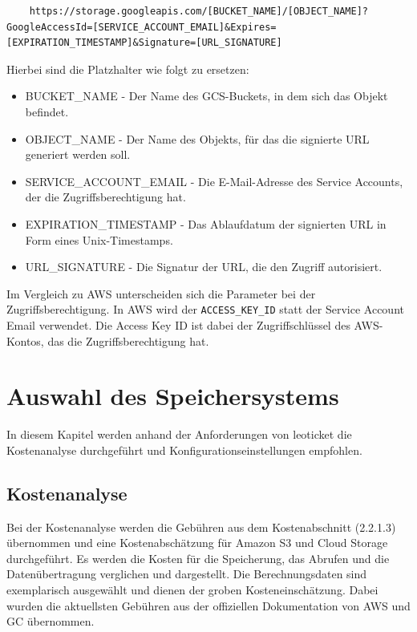 \begin{lstlisting}
	https://storage.googleapis.com/[BUCKET_NAME]/[OBJECT_NAME]?GoogleAccessId=[SERVICE_ACCOUNT_EMAIL]&Expires=[EXPIRATION_TIMESTAMP]&Signature=[URL_SIGNATURE]
\end{lstlisting}

Hierbei sind die Platzhalter wie folgt zu ersetzen:

\begin{itemize}
	\item BUCKET\_NAME - Der Name des GCS-Buckets, in dem sich das Objekt befindet.
	\item OBJECT\_NAME - Der Name des Objekts, für das die signierte URL generiert werden soll.
	\item SERVICE\_ACCOUNT\_EMAIL - Die E-Mail-Adresse des Service Accounts, der die Zugriffsberechtigung hat.
	\item EXPIRATION\_TIMESTAMP - Das Ablaufdatum der signierten URL in Form eines Unix-Timestamps.
	\item URL\_SIGNATURE - Die Signatur der URL, die den Zugriff autorisiert.
\end{itemize}

Im Vergleich zu AWS unterscheiden sich die Parameter bei der Zugriffsberechtigung. In AWS wird der \verb|ACCESS_KEY_ID| statt der Service Account Email verwendet. Die Access Key ID ist dabei der Zugriffschlüssel des AWS-Kontos, das die Zugriffsberechtigung hat.

\newpage

\section{Auswahl des Speichersystems}

In diesem Kapitel werden anhand der Anforderungen von leoticket die Kostenanalyse durchgeführt und Konfigurationseinstellungen empfohlen.

\subsection{Kostenanalyse}

Bei der Kostenanalyse werden die Gebühren aus dem Kostenabschnitt (2.2.1.3) übernommen und eine Kostenabschätzung für Amazon S3 und Cloud Storage durchgeführt. Es werden die Kosten für die Speicherung, das Abrufen und die Datenübertragung verglichen und dargestellt. Die Berechnungsdaten sind exemplarisch ausgewählt und dienen der groben Kosteneinschätzung. Dabei wurden die aktuellsten Gebühren aus der offiziellen Dokumentation von AWS und GC übernommen.\\

